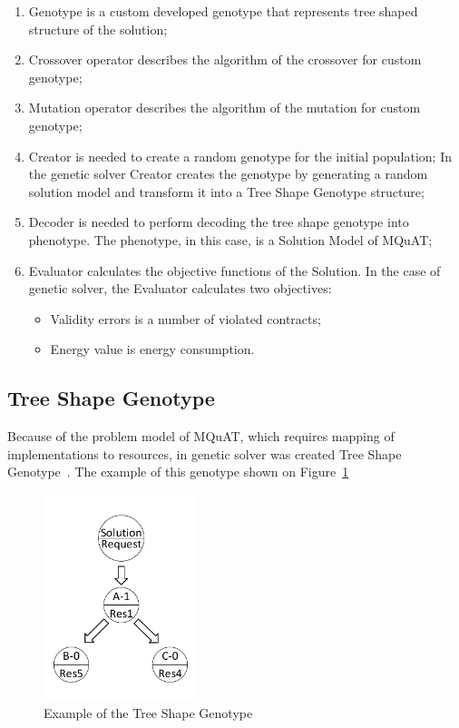 \begin{enumerate}
	\item Genotype is a custom developed genotype that represents tree shaped structure of the solution;
	\item Crossover operator describes the algorithm of the crossover for custom genotype;
	\item Mutation operator describes the algorithm of the mutation for custom genotype;
	\item Creator is needed to create a random genotype for the initial population;
	In the genetic solver Creator creates the genotype by generating a random solution model and transform it into a Tree Shape Genotype structure;
	\item Decoder is needed to perform decoding the tree shape genotype into phenotype. The phenotype, in this case, is a Solution Model of MQuAT;
	\item Evaluator calculates the objective functions of the Solution. In the case of genetic solver, the Evaluator calculates two objectives: 
	
	\begin{itemize}
		\item Validity errors is a number of violated contracts;
		\item Energy value is energy consumption.
	\end{itemize}
	
\end{enumerate}

\subsection{Tree Shape Genotype}

Because of the problem model of MQuAT, which requires mapping of implementations to resources, in genetic solver was created Tree Shape Genotype~\cite{ahmad18}.
The example of this genotype shown on Figure~\ref{fig:TreeShapeGenotypeExample}

\begin{figure}
	\centering
	\includegraphics[width=0.4\textwidth]{images/TreeShapeGenotypeExample.pdf}
	\caption[Example of the Tree Shape Genotype]{Example of the Tree Shape Genotype}
	\label{fig:TreeShapeGenotypeExample}
\end{figure}

